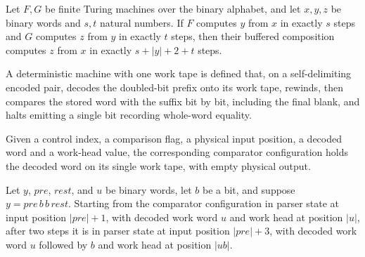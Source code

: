 \begin{lemma}
\label{Complexity.a3n_comp_at}
\leanok
{}
Let $F,G$ be finite Turing machines over the binary alphabet, and let $x,y,z$ be binary
words and $s,t$ natural numbers. If $F$ computes $y$ from $x$ in exactly $s$ steps and
$G$ computes $z$ from $y$ in exactly $t$ steps, then their buffered composition computes
$z$ from $x$ in exactly $s+|y|+2+t$ steps.
\end{lemma}

\begin{definition}
\label{Complexity.a3nEqTM}
\leanok
{}
A deterministic machine with one work tape is defined that, on a self-delimiting encoded pair, decodes the doubled-bit prefix onto its work tape, rewinds, then compares the stored word with the suffix bit by bit, including the final blank, and halts emitting a single bit recording whole-word equality.
\end{definition}

\begin{definition}
\label{Complexity.a3nEqCfg}
\leanok
{}
Given a control index, a comparison flag, a physical input position, a decoded word and a work-head value, the corresponding comparator configuration holds the decoded word on its single work tape, with empty physical output.
\end{definition}

\begin{lemma}
\label{Complexity.a3n_eq_double}
\leanok
{}
Let $y$, $pre$, $rest$, and $u$ be binary words, let $b$ be a bit, and suppose
$y=pre\,b\,b\,rest$. Starting from the comparator configuration in parser state at input
position $|pre|+1$, with decoded work word $u$ and work head at position $|u|$, after
two steps it is in parser state at input position $|pre|+3$, with decoded work word $u$
followed by $b$ and work head at position $|u b|$.
\end{lemma}

